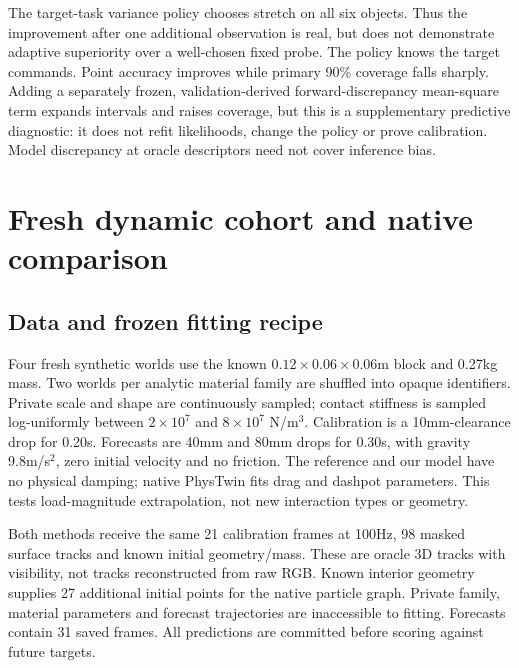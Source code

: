 \documentclass[10pt,twocolumn,letterpaper]{article}
\begin{document}
The target-task variance policy chooses stretch on all six objects. Thus the improvement after one additional observation is real, but does not demonstrate adaptive superiority over a well-chosen fixed probe. The policy knows the target commands. Point accuracy improves while primary 90\% coverage falls sharply. Adding a separately frozen, validation-derived forward-discrepancy mean-square term expands intervals and raises coverage, but this is a supplementary predictive diagnostic: it does not refit likelihoods, change the policy or prove calibration. Model discrepancy at oracle descriptors need not cover inference bias.

\section{Fresh dynamic cohort and native comparison}
\subsection{Data and frozen fitting recipe}
Four fresh synthetic worlds use the known $0.12\times0.06\times0.06$m block and 0.27kg mass. Two worlds per analytic material family are shuffled into opaque identifiers. Private scale and shape are continuously sampled; contact stiffness is sampled log-uniformly between $2\times10^7$ and $8\times10^7$ N/m$^3$. Calibration is a 10mm-clearance drop for 0.20s. Forecasts are 40mm and 80mm drops for 0.30s, with gravity 9.8m/s$^2$, zero initial velocity and no friction. The reference and our model have no physical damping; native PhysTwin fits drag and dashpot parameters. This tests load-magnitude extrapolation, not new interaction types or geometry.

Both methods receive the same 21 calibration frames at 100Hz, 98 masked surface tracks and known initial geometry/mass. These are oracle 3D tracks with visibility, not tracks reconstructed from raw RGB. Known interior geometry supplies 27 additional initial points for the native particle graph. Private family, material parameters and forecast trajectories are inaccessible to fitting. Forecasts contain 31 saved frames. All predictions are committed before scoring against future targets.
\end{document}
